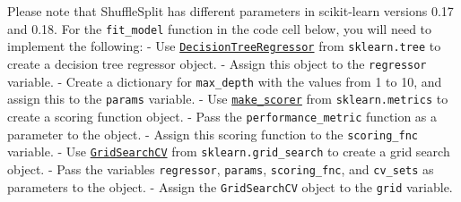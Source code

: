 \documentclass[11pt]{article}
\begin{document}
Please note that ShuffleSplit has different parameters in scikit-learn
versions 0.17 and 0.18. For the \texttt{fit\_model} function in the code
cell below, you will need to implement the following: - Use
\href{http://scikit-learn.org/stable/modules/generated/sklearn.tree.DecisionTreeRegressor.html}{\texttt{DecisionTreeRegressor}}
from \texttt{sklearn.tree} to create a decision tree regressor object. -
Assign this object to the
\texttt{\textquotesingle{}regressor\textquotesingle{}} variable. -
Create a dictionary for
\texttt{\textquotesingle{}max\_depth\textquotesingle{}} with the values
from 1 to 10, and assign this to the
\texttt{\textquotesingle{}params\textquotesingle{}} variable. - Use
\href{http://scikit-learn.org/stable/modules/generated/sklearn.metrics.make_scorer.html}{\texttt{make\_scorer}}
from \texttt{sklearn.metrics} to create a scoring function object. -
Pass the \texttt{performance\_metric} function as a parameter to the
object. - Assign this scoring function to the
\texttt{\textquotesingle{}scoring\_fnc\textquotesingle{}} variable. -
Use
\href{http://scikit-learn.org/stable/modules/generated/sklearn.model_selection.GridSearchCV.html}{\texttt{GridSearchCV}}
from \texttt{sklearn.grid\_search} to create a grid search object. -
Pass the variables
\texttt{\textquotesingle{}regressor\textquotesingle{}},
\texttt{\textquotesingle{}params\textquotesingle{}},
\texttt{\textquotesingle{}scoring\_fnc\textquotesingle{}}, and
\texttt{\textquotesingle{}cv\_sets\textquotesingle{}} as parameters to
the object. - Assign the \texttt{GridSearchCV} object to the
\texttt{\textquotesingle{}grid\textquotesingle{}} variable.
\end{document}
